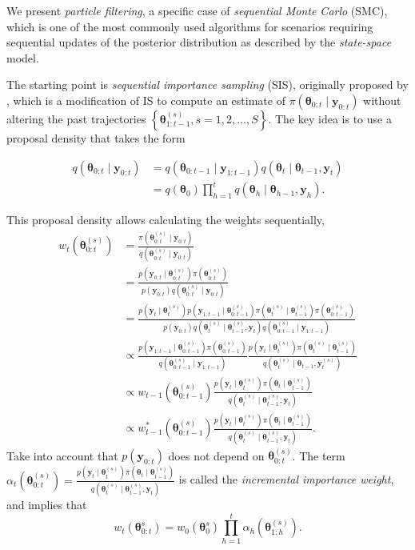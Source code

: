 We present \textit{particle filtering}, a specific case of \textit{sequential Monte Carlo} (SMC), which is one of the most commonly used algorithms for scenarios requiring sequential updates of the posterior distribution as described by the \textit{state-space} model.

The starting point is \textit{sequential importance sampling} (SIS), originally proposed by \cite{handschin1969monte}, which is a modification of IS to compute an estimate of $\pi(\bm{\theta}_{0:t}\mid \bm{y}_{0:t})$ without altering the past trajectories $\left\{\bm{\theta}^{(s)}_{1:t-1}, s=1,2,\dots,S\right\}$. The key idea is to use a proposal density that takes the form

\begin{align*}
	q(\bm{\theta}_{0:t}\mid \bm{y}_{0:t}) &= q(\bm{\theta}_{0:t-1}\mid \bm{y}_{1:t-1})q(\bm{\theta}_t\mid \bm{\theta}_{t-1},\bm{y}_{t}) \\
	&= q(\bm{\theta}_0)\prod_{h=1}^{t}q(\bm{\theta}_h\mid \bm{\theta}_{h-1},\bm{y}_{h}).
\end{align*}

This proposal density allows calculating the weights sequentially,
\begin{align*}
	w_{t}(\bm{\theta}^{(s)}_{0:t})&=\frac{\pi(\bm{\theta}_{0:t}^{(s)}\mid \bm{y}_{0:t})}{q(\bm{\theta}_{0:t}^{(s)}\mid \bm{y}_{0:t})}\\
	&=\frac{p(\bm{y}_{0:t}\mid \bm{\theta}_{0:t}^{(s)})\pi(\bm{\theta}_{0:t}^{(s)})}{p(\bm{y}_{0:t})q(\bm{\theta}_{0:t}^{(s)}\mid \bm{y}_{0:t})}\\
	&=\frac{p(\bm{y}_{t}\mid \bm{\theta}_{t}^{(s)})p(\bm{y}_{1:t-1}\mid \bm{\theta}_{0:t-1}^{(s)})\pi(\bm{\theta}_{t}^{(s)}\mid \bm{\theta}_{t-1}^{(s)})\pi(\bm{\theta}_{0:t-1}^{(s)})}{p(\bm{y}_{0:t})q(\bm{\theta}_{t}^{(s)}\mid \bm{\theta}_{t-1}^{(s)},\bm{y}_{t})q(\bm{\theta}_{0:t-1}^{(s)}\mid \bm{y}_{1:t-1})}\\
	&\propto\frac{p(\bm{y}_{1:t-1}\mid \bm{\theta}_{0:t-1}^{(s)})\pi(\bm{\theta}_{0:t-1}^{(s)})}{q(\bm{\theta}_{0:t-1}^{(s)}\mid \bm{y}_{1:t-1})}\frac{p(\bm{y}_{t}\mid \bm{\theta}_{t}^{(s)})\pi(\bm{\theta}_{t}^{(s)}\mid \bm{\theta}_{t-1}^{(s)})}{q(\bm{\theta}_{t}^{(s)}\mid \bm{\theta}_{t-1},\bm{y}_{t}^{(s)})}\\
	&\propto w_{t-1}(\bm{\theta}^{(s)}_{0:t-1})\frac{p(\bm{y}_{t}\mid \bm{\theta}_{t}^{(s)})\pi(\bm{\theta}_{t}\mid \bm{\theta}_{t-1}^{(s)})}{q(\bm{\theta}_t^{(s)}\mid \bm{\theta}_{t-1}^{(s)},\bm{y}_{t})}\\
	&\propto w_{t-1}^*(\bm{\theta}^{(s)}_{0:t-1})\frac{p(\bm{y}_{t}\mid \bm{\theta}_{t}^{(s)})\pi(\bm{\theta}_{t}\mid \bm{\theta}_{t-1}^{(s)})}{q(\bm{\theta}_t^{(s)}\mid \bm{\theta}_{t-1}^{(s)},\bm{y}_{t})}.
\end{align*} 
Take into account that $p(\bm{y}_{0:t})$ does not depend on $\bm{\theta}^{(s)}_{0:t}$. The term $\alpha_t(\bm{\theta}_{0:t}^{(s)})=\frac{p(\bm{y}_{t}\mid \bm{\theta}_{t}^{(s)})\pi(\bm{\theta}_{t}\mid \bm{\theta}_{t-1}^{(s)})}{q(\bm{\theta}_t^{(s)}\mid \bm{\theta}_{t-1}^{(s)},\bm{y}_{t})}$ is called the \textit{incremental importance weight}, and implies that
$$w_t(\bm{\theta}^{s}_{0:t})=w_0(\bm{\theta}^{s}_{0})\prod_{h=1}^{t}\alpha_h(\bm{\theta}_{1:h}^{(s)}).$$ 

